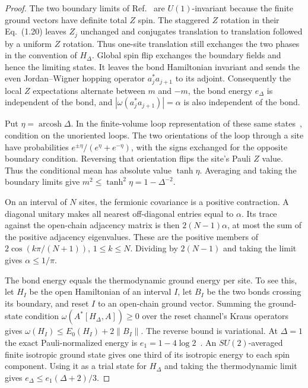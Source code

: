 \begin{proof}
The two boundary limits of Ref.~\cite[Proposition~1.3]{ADW20} are
$U(1)$-invariant because the finite ground vectors have definite total
$Z$ spin. The staggered $Z$ rotation in their Eq.~(1.20) leaves $Z_j$
unchanged and conjugates translation to translation followed by a uniform
$Z$ rotation. Thus one-site translation still exchanges the two phases
in the convention of $H_\Delta$. Global spin flip exchanges the boundary
fields and hence the limiting states. It leaves the bond Hamiltonian
invariant and sends the even Jordan--Wigner hopping operator
$a_j^*a_{j+1}$ to its adjoint. Consequently the local $Z$ expectations
alternate between $m$ and $-m$, the bond energy $e_\Delta$ is independent
of the bond, and $|\omega(a_j^*a_{j+1})|=\alpha$ is also independent of
the bond.

Put $\eta=\operatorname{arcosh}\Delta$. In the finite-volume loop
representation of these same states~\cite[Theorem~4.2 and
Eqs.~(4.7)--(4.10)]{ADW20}, condition on the unoriented loops. The two
orientations of the loop through a site have probabilities
$e^{\pm\eta}/(e^\eta+e^{-\eta})$, with the signs exchanged for the
opposite boundary condition. Reversing that orientation flips the
site's Pauli $Z$ value. Thus the conditional mean has absolute value
$\tanh\eta$. Averaging and taking the boundary limits give
$m^2\le\tanh^2\eta=1-\Delta^{-2}$.

On an interval of $N$ sites, the fermionic covariance is a positive
contraction. A diagonal unitary makes all nearest off-diagonal
entries equal to $\alpha$. Its trace against the open-chain adjacency
matrix is then $2(N-1)\alpha$, at most the sum of the positive adjacency
eigenvalues. These are the positive members of
$2\cos(k\pi/(N+1))$, $1\le k\le N$. Dividing by $2(N-1)$ and taking
the limit gives $\alpha\le1/\pi$.

The bond energy equals the thermodynamic ground energy per site.
To see this, let $H_I$ be the open Hamiltonian of an interval $I$,
let $B_I$ be the two bonds crossing its boundary, and reset $I$ to
an open-chain ground vector. Summing the ground-state condition
$\omega(A^*[H_\Delta,A])\ge0$ over the reset channel's Kraus operators
gives $\omega(H_I)\le E_0(H_I)+2\|B_I\|$. The reverse bound is
variational. At $\Delta=1$ the exact Pauli-normalized energy is
$e_1=1-4\log2$~\cite{Hulthen38}. An $SU(2)$-averaged finite isotropic
ground state gives one third of its isotropic energy to each spin
component. Using it as a trial state for $H_\Delta$ and taking the
thermodynamic limit gives $e_\Delta\le e_1(\Delta+2)/3$.


\end{proof}
